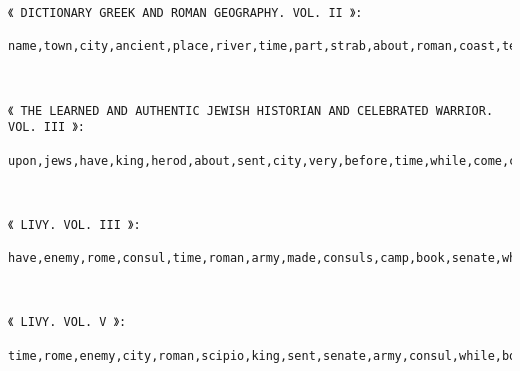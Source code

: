 \documentclass[11pt]{article}
\begin{document}
    \begin{Verbatim}[commandchars=\\\{\}]
《 DICTIONARY GREEK AND ROMAN GEOGRAPHY. VOL. II 》:
 name,town,city,ancient,place,river,time,part,strab,about,roman,coast,temple,ptol,though,first,pliny,country,plin,site

    \end{Verbatim}

    \begin{center}
    \end{center}
    { \hspace*{\fill} \\}
    
    \begin{Verbatim}[commandchars=\\\{\}]
《 THE LEARNED AND AUTHENTIC JEWISH HISTORIAN AND CELEBRATED WARRIOR. VOL. III 》:
 upon,jews,have,king,herod,about,sent,city,very,before,time,while,come,chap,caesar,agrippa,country,thou,account,together

    \end{Verbatim}

    \begin{center}
    \end{center}
    { \hspace*{\fill} \\}
    
    \begin{Verbatim}[commandchars=\\\{\}]
《 LIVY. VOL. III 》:
 have,enemy,rome,consul,time,roman,army,made,consuls,camp,book,senate,while,history,troops,city,either,battle,thousand,sent

    \end{Verbatim}

    \begin{center}
    \end{center}
    { \hspace*{\fill} \\}
    
    \begin{Verbatim}[commandchars=\\\{\}]
《 LIVY. VOL. V 》:
 time,rome,enemy,city,roman,scipio,king,sent,senate,army,consul,while,book,thousand,history,troops,camp,general,hannibal,livy

    \end{Verbatim}
\end{document}
